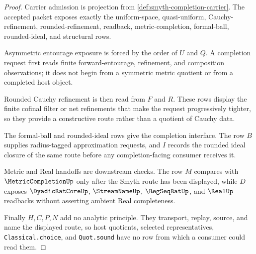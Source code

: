 \begin{proof}
Carrier admission is projection from \autoref{def:smyth-completion-carrier}. The accepted packet exposes exactly the uniform-space, quasi-uniform, Cauchy-refinement, rounded-refinement, readback, metric-completion, formal-ball, rounded-ideal, and structural rows.

Asymmetric entourage exposure is forced by the order of $U$ and $Q$. A completion request first reads finite forward-entourage, refinement, and composition observations; it does not begin from a symmetric metric quotient or from a completed host object.

Rounded Cauchy refinement is then read from $F$ and $R$. These rows display the finite cofinal filter or net refinements that make the request progressively tighter, so they provide a constructive route rather than a quotient of Cauchy data.

The formal-ball and rounded-ideal rows give the completion interface. The row $B$ supplies radius-tagged approximation requests, and $I$ records the rounded ideal closure of the same route before any completion-facing consumer receives it.

Metric and Real handoffs are downstream checks. The row $M$ compares with $\MetricCompletionUp$ only after the Smyth route has been displayed, while $D$ exposes $\DyadicRatCoreUp$, $\StreamNameUp$, $\RegSeqRatUp$, and $\RealUp$ readbacks without asserting ambient Real completeness.

Finally $H,C,P,N$ add no analytic principle. They transport, replay, source, and name the displayed route, so host quotients, selected representatives, \texttt{Classical.choice}, and \texttt{Quot.sound} have no row from which a consumer could read them.
\end{proof}

